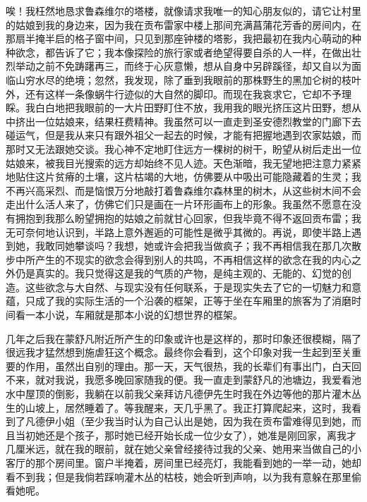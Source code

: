 \par 唉！我枉然地恳求鲁森维尔的塔楼，就像请求我唯一的知心朋友似的，请它让村里的姑娘到我的身边来，因为我在贡布雷家中楼上那间充满菖蒲花芳香的房间内，在那扇半掩半启的格子窗中间，只见到那座钟楼的塔影，我把最初在我内心萌动的种种欲念，都告诉了它；我本像探险的旅行家或者绝望得要自杀的人一样，在做出壮烈举动之前不免踌躇再三，而终于心灰意懒，想从自身中另辟蹊径，却又自以为面临山穷水尽的绝境；忽然，我发现，除了垂到我眼前的那株野生的黑加仑树的枝叶外，还有这样一条像蜗牛行迹似的大自然的脚印。而现在我哀求它，它却不予理睬。我白白地把我眼前的一大片田野盯住不放，我用我的眼光挤压这片田野，想从中挤出一位姑娘来，结果枉费精神。我虽然可以一直走到圣安德烈教堂的门廊下去碰运气，但是我从来只有跟外祖父一起去的时候，才能有把握地遇到农家姑娘，而那时又无法跟她交谈。我心神不定地盯住远方一棵树的树干，盼望从树后走出一位姑娘来，被我目光搜索的远方却始终不见人迹。天色渐暗，我无望地把注意力紧紧地贴住这片贫瘠的土壤，这片枯竭的大地，仿佛要从中吸出可能隐藏着的生灵；我不再兴高采烈、而是恼恨万分地敲打着鲁森维尔森林里的树木，从这些树木间不会走出什么活人来了，仿佛它们只是画在一片环形画布上的形象。我虽然不愿意在没有拥抱到我那么盼望拥抱的姑娘之前就甘心回家，但我毕竟不得不返回贡布雷；我无可奈何地认识到，半路上意外邂逅的可能性是微乎其微的。再说，即使半路上遇到她，我敢同她攀谈吗？我想，她或许会把我当做疯子；我不再相信我在那几次散步中所产生的不现实的欲念会得到别人的共鸣，不再相信这样的欲念在我的内心之外仍是真实的。我只觉得这是我的气质的产物，是纯主观的、无能的、幻觉的创造。这些欲念与大自然、与现实没有任何联系，于是现实失去了它的一切魅力和意蕴，只成了我的实际生活的一个沿袭的框架，正等于坐在车厢里的旅客为了消磨时间看一本小说，车厢就是那本小说的幻想世界的框架。
\par 几年之后我在蒙舒凡附近所产生的印象或许也是这样的，那时印象还很模糊，隔了很远我才猛然想到施虐狂这个概念。最终你会看到，这个印象对我一生起到至关重要的作用，虽然出自别的理由。那一天，天气很热，我的长辈们有事出门，白天回不来，就对我说，我愿多晚回家随我的便。我一直走到蒙舒凡的池塘边，我爱看池水中屋顶的倒影，我躺在以前我父亲拜访凡德伊先生时我在外边等他的那片灌木丛生的山坡上，居然睡着了。等我醒来，天几乎黑了。我正打算爬起来，这时，我看到了凡德伊小姐（至少我当时认为自己认出是她，因为我在贡布雷难得见到她，而且当初她还是个孩子，那时她已经开始长成一位少女了），她准是刚回家，离我才几厘米远，就在我的眼前，就在她父亲曾经接待过我的父亲、她用来当做自己的小客厅的那个房间里。窗户半掩着，房间里已经亮灯，我能看到她的一举一动，她却看不到我；但是我倘若踩响灌木丛的枯枝，她会听到声响，以为我有意躲在那里偷看她呢。
